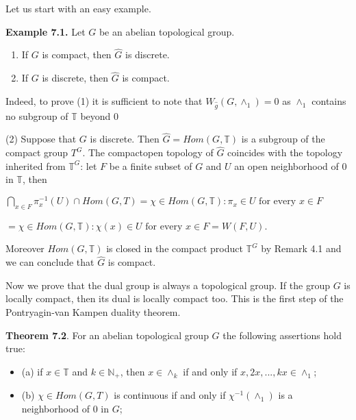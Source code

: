 \documentclass[12pt]{article}
\begin{document}
\begin{itemize}
\begin{itemize}
    Let us start with an easy example.


\textbf{Example 7.1.} Let $G$  be an abelian topological group.


    \begin{enumerate}

        \item If $G$ is compact, then $\hat{G}$ is discrete.

        \item If $G$ is discrete, then $\hat{G}$ is compact.

    \end{enumerate}


    Indeed, to prove (1) it is sufficient to note that $W_{\hat{g}}(G,\wedge_1) = {0}$ as $\wedge_1$ contains no subgroup of $\mathbb{T}$ beyond 0


    (2) Suppose that $G$ is discrete. Then $\hat{G} = Hom(G,\mathbb{T})$ is a subgroup of the compact group $T^G$. The 
compactopen topology of $\hat{G}$ coincides with the topology inherited from $\mathbb{T}^G$: let $F$ be a finite subset of $G$ and $U$ an open
neighborhood of 0 in $\mathbb{T}$, then


    $\bigcap_{x \in F} π^{-1}_x (U) \cap Hom (G,T) = {\chi \in Hom(G,\mathbb{T}) : \pi_x \in U \text{ for every } x \in F}$


        $= {\chi \in Hom (G,\mathbb{T}) : \chi(x) \in U \text{ for every } x \in F} = W(F, U)$.


    Moreover $Hom (G,\mathbb{T})$ is closed in the compact product $\mathbb{T}^G$ by Remark 4.1 and we can conclude that $\hat{G}$ is
compact.


    Now we prove that the dual group is always a topological group. If the group $G$ is locally compact, then its
dual is locally compact too. This is the first step of the Pontryagin-van Kampen duality theorem.


\textbf{Theorem 7.2}. For an abelian topological group $G$ the following assertions hold true:


    \begin{itemize}

        \item (a) if $x \in \mathbb{T}$ and $k \in \mathbb{N}_+$, then $x \in \wedge_k$ if and only if $x, 2x, . . . , kx \in \wedge_1$;
        
        \item (b) $\chi \in Hom (G,T)$ is continuous if and only if $\chi^{-1} (\wedge_1)$ is a neighborhood of 0 in $G$;
        

\end{itemize}
\end{itemize}
\end{itemize}
\end{document}
